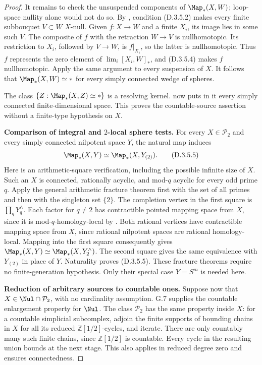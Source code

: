 \begin{proof}
It remains to check the unsuspended components of
$\Map_*(X,W)$; loop-space nullity alone would not do so.
By \cite[Corollary~12(a)]{I_Strom2012}, condition
(D.3.5.2) makes every finite subbouquet $V\subset W$
$X$-null. Given $f:X\to W$ and a finite $X_i$, its image
lies in some such $V$. The composite of $f$ with the
retraction $W\to V$ is nullhomotopic. Its restriction to
$X_i$, followed by $V\to W$, is $f|_{X_i}$, so the latter
is nullhomotopic. Thus $f$ represents the zero element of
$\lim_i[X_i,W]_*$, and (D.3.5.4) makes $f$ nullhomotopic.
Apply the same argument to every suspension of $X$.
It follows that $\Map_*(X,W)\simeq *$ for every simply
connected wedge of spheres.

The class $\{Z:\Map_*(X,Z)\simeq *\}$ is a resolving
kernel. \cite[Corollary~12(b)]{I_Strom2012} now puts in
it every simply connected finite-dimensional space.
This proves the countable-source assertion without a
finite-type hypothesis on $X$.

\medskip\noindent
\textbf{Comparison of integral and $2$-local sphere tests.}
For every $X\in\mathcal P_2$ and every simply connected
nilpotent space $Y$, the natural map induces
\[
        \Map_*(X,Y)\simeq\Map_*(X,Y_{(2)}).
 \tag{D.3.5.5}
\]
Here is an arithmetic-square verification, including the
possible infinite size of $X$. Such an $X$ is connected,
rationally acyclic, and mod-$q$ acyclic for every odd
prime $q$. Apply the general arithmetic fracture theorem
\cite[Theorem~13.1.4]{FGHMayPonto2012} first with the set
of all primes and then with the singleton set $\{2\}$.
The completion vertex in the first square is
$\prod_qY_q^{\wedge}$. Each factor for $q\ne2$ has
contractible pointed mapping space from $X$, since it is
mod-$q$-homology-local by
\cite[Theorems~11.1.1--11.1.2]{FGHMayPonto2012}.
Both rational vertices have contractible mapping space
from $X$, since rational nilpotent spaces are rational
homology-local. Mapping into the first square consequently
gives $\Map_*(X,Y)\simeq\Map_*(X,Y_2^{\wedge})$.
The second square gives the same equivalence with
$Y_{(2)}$ in place of $Y$. Naturality proves (D.3.5.5).
These fracture theorems require no finite-generation
hypothesis. Only their special case $Y=S^m$ is needed here.

\medskip\noindent
\textbf{Reduction of arbitrary sources to countable ones.}
Suppose now that $X\in\Nul\cap\mathcal P_2$, with no
cardinality assumption. G.7 supplies the countable
enlargement property for $\Nul$. The class $\mathcal P_2$
has the same property inside $X$: for a countable
simplicial subcomplex, adjoin the finite supports of
bounding chains in $X$ for all its reduced
$\mathbb Z[1/2]$-cycles, and iterate. There are only
countably many such finite chains, since
$\mathbb Z[1/2]$ is countable. Every cycle in the resulting
union bounds at the next stage. This also applies in
reduced degree zero and ensures connectedness.


\end{proof}
